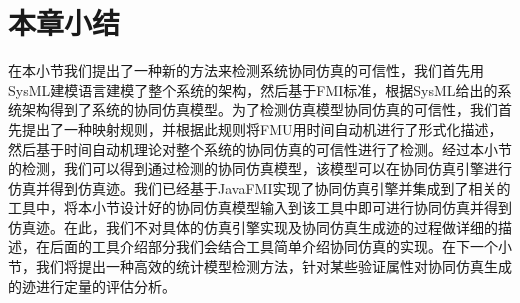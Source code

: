 \section{本章小结}
在本小节我们提出了一种新的方法来检测系统协同仿真的可信性，我们首先用SysML建模语言建模了整个系统的架构，然后基于FMI标准，根据SysML给出的系统架构得到了系统的协同仿真模型。为了检测仿真模型协同仿真的可信性，我们首先提出了一种映射规则，并根据此规则将FMU用时间自动机进行了形式化描述，然后基于时间自动机理论对整个系统的协同仿真的可信性进行了检测。经过本小节的检测，我们可以得到通过检测的协同仿真模型，该模型可以在协同仿真引擎进行仿真并得到仿真迹。我们已经基于JavaFMI\cite{Camus2016Hybrid}实现了协同仿真引擎并集成到了相关的工具中，将本小节设计好的协同仿真模型输入到该工具中即可进行协同仿真并得到仿真迹。在此，我们不对具体的仿真引擎实现及协同仿真生成迹的过程做详细的描述，在后面的工具介绍部分我们会结合工具简单介绍协同仿真的实现。在下一个小节，我们将提出一种高效的统计模型检测方法，针对某些验证属性对协同仿真生成的迹进行定量的评估分析。